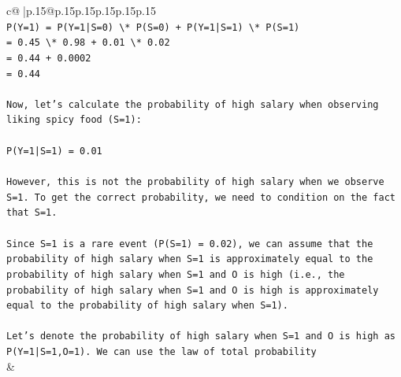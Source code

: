 \documentclass{article}
\begin{document}
{\begin{supertabular}{c@{$\;$}|p{.15\linewidth}@{}p{.15\linewidth}p{.15\linewidth}p{.15\linewidth}p{.15\linewidth}p{.15\linewidth}}
{{{\\ 
\texttt{P(Y=1) = P(Y=1|S=0) \textbackslash{}* P(S=0) + P(Y=1|S=1) \textbackslash{}* P(S=1)} \\
\texttt{= 0.45 \textbackslash{}* 0.98 + 0.01 \textbackslash{}* 0.02} \\
\texttt{= 0.44 + 0.0002} \\
\texttt{= 0.44} \\
\\ 
\texttt{Now, let's calculate the probability of high salary when observing liking spicy food (S=1):} \\
\\ 
\texttt{P(Y=1|S=1) = 0.01} \\
\\ 
\texttt{However, this is not the probability of high salary when we observe S=1. To get the correct probability, we need to condition on the fact that S=1. } \\
\\ 
\texttt{Since S=1 is a rare event (P(S=1) = 0.02), we can assume that the probability of high salary when S=1 is approximately equal to the probability of high salary when S=1 and O is high (i.e., the probability of high salary when S=1 and O is high is approximately equal to the probability of high salary when S=1).} \\
\\ 
\texttt{Let's denote the probability of high salary when S=1 and O is high as P(Y=1|S=1,O=1). We can use the law of total probability} \\
            }
        }
    }
    & \\ \\


\end{supertabular}}
\end{document}
